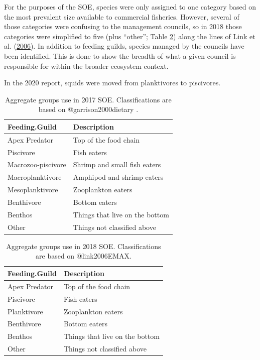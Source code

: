 \documentclass[
]{book}
\begin{document}
For the purposes of the SOE, species were only assigned to one category based on the most prevalent size available to commercial fisheries. However, several of those categories were confusing to the management councils, so in 2018 those categories were simplified to five (plus ``other''; Table \ref{tab:soe2018class}) along the lines of Link et al. (\protect\hyperlink{ref-link2006EMAX}{2006}). In addition to feeding guilds, species managed by the councils have been identified. This is done to show the breadth of what a given council is responsible for within the broader ecosystem context.

In the 2020 report, squids were moved from planktivores to piscivores.

\begin{table}

\caption{\label{tab:soe2017class}Aggregate groups use in 2017 SOE.  Classifications are based on @garrison2000dietary . \label{}}
\centering
\begin{tabular}[t]{ll}
\toprule
Feeding.Guild & Description\\
\midrule
Apex Predator & Top of the food chain\\
Piscivore & Fish eaters\\
Macrozoo-piscivore & Shrimp and small fish eaters\\
Macroplanktivore & Amphipod and shrimp eaters\\
Mesoplanktivore & Zooplankton eaters\\
\addlinespace
Benthivore & Bottom eaters\\
Benthos & Things that live on the bottom\\
Other & Things not classified above\\
\bottomrule
\end{tabular}
\end{table}

\begin{table}

\caption{\label{tab:soe2018class}Aggregate groups use in 2018 SOE.  Classifications are based on @link2006EMAX.}
\centering
\begin{tabular}[t]{ll}
\toprule
Feeding.Guild & Description\\
\midrule
Apex Predator & Top of the food chain\\
Piscivore & Fish eaters\\
Planktivore & Zooplankton eaters\\
Benthivore & Bottom eaters\\
Benthos & Things that live on the bottom\\
\addlinespace
Other & Things not classified above\\
\bottomrule
\end{tabular}
\end{table}
\end{document}
